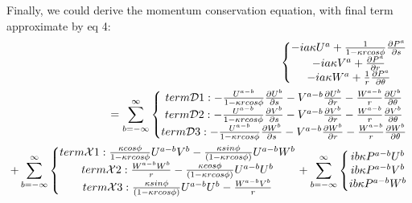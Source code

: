 \documentclass{Note}
\begin{document}
Finally, we could derive the momentum conservation equation, with final term approximate by eq 4:
\begin{equation}
\begin{aligned}
\left\{\begin{matrix}
-ia\kappa U^a+{1\over {1-\kappa rcos\phi}}{\partial P^a\over {\partial s}}\\
-ia\kappa V^a+{\partial P^a\over {\partial r}}\\
-ia\kappa W^a+{1\over r}{\partial P^a\over {\partial \theta}}
\end{matrix}\right.\\
=
\sum_{b=-\infty}^{\infty}
\left\{\begin{matrix}
term\mathcal{D}1: -{U^{a-b}\over {1-\kappa r cos\phi}}  {{\partial U^b} \over {\partial s}}-V^{a-b}{{\partial U^b}\over{\partial r}}-{W^{a-b}\over r}{{\partial U^b}\over {\partial \theta}}\\
term\mathcal{D}2: -{U^{a-b}\over {1-\kappa r cos\phi}}  {{\partial V^b} \over {\partial s}}-V^{a-b}{{\partial V^b}\over{\partial r}}-{W^{a-b}\over r}{{\partial V^b}\over {\partial \theta}}\\
term\mathcal{D}3: -{U^{a-b}\over {1-\kappa r cos\phi}}  {{\partial W^b} \over {\partial s}}-V^{a-b}{{\partial W^b}\over{\partial r}}-{W^{a-b}\over r}{{\partial W^b}\over {\partial \theta}}\\
\end{matrix}\right.\\
+ \sum_{b=-\infty}^{\infty}\left\{\begin{matrix}
term\mathcal{X}1: {\kappa cos\phi \over{1-\kappa rcos\phi}}U^{a-b}V^b-{\kappa sin\phi \over{(1-\kappa r cos\phi)}}U^{a-b}W^b\\
term\mathcal{X}2: {W^{a-b}W^b\over{r}}-{\kappa cos\phi \over{(1-\kappa r cos\phi)}}U^{a-b}U^b\\
term\mathcal{X}3: {\kappa sin\phi \over{(1-\kappa r cos\phi)}}U^{a-b}U^b-{W^{a-b}V^b\over{r}}\\
\end{matrix}\right.
+\sum_{b=-\infty}^{\infty}\left\{\begin{matrix}
ib\kappa P^{a-b}U^{b}\\
ib\kappa P^{a-b}V^{b}\\
ib\kappa P^{a-b}W^{b}
\end{matrix}\right.\\
\end{aligned}
\end{equation}
\end{document}
